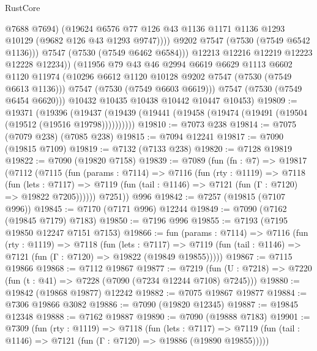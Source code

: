 \begin{lexlean}{RustCore}
\begin{coremodule}
                      @7688
                      @7694)
                    (@19624
                      @6576
                      @77
                      @126
                      @43
                      @1136
                      @1171
                      @1136
                      @1293
                      @10129
                      (@9682 @126 @43 @1293 @9747))))
                @9202
                @7547
                (@7530 (@7549 @6542 @1136)))
              @7547
              (@7530 (@7549 @6462 @6584)))
            @12213
            @12216
            @12219
            @12223
            @12228
            @12234))
        (@11956
          @79
          @43
          @46
          @2994
          @6619
          @6629
          @1113
          @6602
          @1120
          @11974
          (@10296 @6612 @1120 @10128 @9202 @7547 (@7530 (@7549 @6613 @1136)))
          @7547
          (@7530 (@7549 @6603 @6619)))
        @7547
        (@7530 (@7549 @6454 @6620)))
      @10432
      @10435
      @10438
      @10442
      @10447
      @10453)
@19809 := @19371
    (@19396 (@19437 (@19439 (@19441 (@19458 (@19474 (@19491 (@19504 (@19512 (@19516 @19798))))))))))
@19810 := @7073 @238
@19814 := @7075 (@7079 @238) (@7085 @238)
@19815 := @7094 @12241
@19817 := @7090 (@19815 @7109)
@19819 := @7132 (@7133 @238)
@19820 := @7128 @19819
@19822 := @7090 (@19820 @7158)
@19839 := @7089
    (fun (fn : @7) =>
    @19817
      (@7112
        (@7115
          (fun (params : @7114) =>
          @7116
            (fun (rty : @1119) =>
            @7118
              (fun (lets : @7117) =>
              @7119 (fun (tail : @1146) => @7121 (fun (Γ : @7120) => @19822 @7205))))))
        @7251))
    @996
@19842 := @7257 (@19815 (@7107 @996))
@19845 := @7170 (@7171 @996) @12244
@19849 := @7090 (@7162 (@19845 @7179) @7183)
@19850 := @7196 @996
@19855 := @7193 (@7195 @19850 @12247 @7151 @7153)
@19866 := fun (params : @7114) =>
  @7116
    (fun (rty : @1119) =>
    @7118
      (fun (lets : @7117) =>
      @7119 (fun (tail : @1146) => @7121 (fun (Γ : @7120) => @19822 (@19849 @19855)))))
@19867 := @7115 @19866
@19868 := @7112 @19867
@19877 := @7219
    (fun (U : @7218) => @7220 (fun (t : @41) => @7228 (@7090 (@7234 @12244 @7108) @7245)))
@19880 := @19842 (@19868 @19877) @12242
@19882 := @7075 @19867 @19877
@19884 := @7306 @19866 @3082
@19886 := @7090 (@19820 @12345)
@19887 := @19845 @12348
@19888 := @7162 @19887
@19890 := @7090 (@19888 @7183)
@19901 := @7309
    (fun (rty : @1119) =>
    @7118
      (fun (lets : @7117) =>
      @7119 (fun (tail : @1146) => @7121 (fun (Γ : @7120) => @19886 (@19890 @19855)))))

\end{coremodule}
\end{lexlean}

